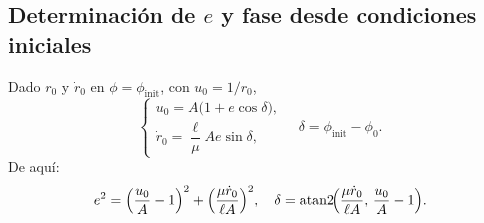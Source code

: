 \documentclass[12pt]{article}
\begin{document}
\subsection*{Determinación de \(e\) y fase desde condiciones iniciales}
Dado \(r_0\) y \(\dot r_0\) en \(\phi=\phi_{\mathrm{init}}\), con \(u_0=1/r_0\),
\[
\begin{cases}
u_0 = A\bigl(1 + e\cos\delta\bigr),\\[4pt]
\dot r_0 = \dfrac{\ell}{\mu}A e\sin\delta,
\end{cases}
\quad \delta = \phi_{\mathrm{init}} - \phi_0.
\]
De aquí:
\[
e^2 = \Bigl(\frac{u_0}{A}-1\Bigr)^2 + \Bigl(\frac{\mu\dot r_0}{\ell A}\Bigr)^2,
\quad
\delta = \operatorname{atan2}\!\Bigl(\frac{\mu\dot r_0}{\ell A},\,\frac{u_0}{A}-1\Bigr).
\]

\end{document}
